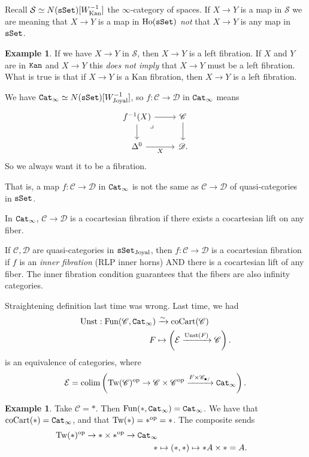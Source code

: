 \documentclass[12pt]{amsart}
\theoremstyle{definition}
\newtheorem{example}[theorem]{Example}
\providecommand{\Unst}{\text{Unst}}
\providecommand{\coCart}{\text{coCart}}
\providecommand{\Tw}{\text{Tw}}
\begin{document}
Recall $\mathcal{S} \simeq N(\texttt{sSet})[W_{\text{Kan}}^{-1}]$ the $\infty$-category of spaces. If $X \to Y$ is a map in $\mathcal{S}$ we are meaning that $X \to Y$ is a map in $\text{Ho}(\texttt{sSet})$ \textit{not} that $X \to Y$ is any map in $\texttt{sSet}$.

\begin{example} If we have $X \to Y$ in $\mathcal{S}$, then $X \to Y$ is a left fibration. If $X$ and $Y$ are in $\texttt{Kan}$ and $X \to Y$ this \textit{does not imply} that $X \to Y$ must be a left fibration. What is true is that if $X \to Y$ is a Kan fibration, then $X \to Y$ is a left fibration.
\end{example}

We have $\texttt{Cat}_\infty\simeq N(\texttt{sSet})[W_{\text{Joyal}}^{-1}]$, so $f: \mathscr{C} \to \mathscr{D}$ in $\texttt{Cat}_\infty$ means
\[ \begin{tikzcd}
    f^{-1}(X)\rar\dar\pb & \mathscr{C}\dar\\
    \Delta^0\rar["X" below] & \mathscr{D}.
\end{tikzcd} \]
So we always want it to be a fibration.

That is, a map $f: \mathscr{C} \to \mathscr{D}$ in $\texttt{Cat}_\infty$ is not the same as $\mathscr{C} \to \mathscr{D}$ of quasi-categories in $\texttt{sSet}$.

In $\texttt{Cat}_\infty$, $\mathscr{C} \to \mathscr{D}$ is a cocartesian fibration if there exists a cocartesian lift on any fiber.

If $\mathscr{C},\mathscr{D}$ are quasi-categories in $\texttt{sSet}_\text{Joyal}$, then $f: \mathscr{C} \to \mathscr{D}$ is a cocartesian fibration if $f$ is an \textit{inner fibration} (RLP inner horns) AND there is a cocartesian lift of any fiber. The inner fibration condition guarantees that the fibers are also infinity categories.

Straightening definition last time was wrong. Last time, we had
\begin{align*}
    \Unst: \Fun(\mathscr{C}, \Cat_\infty) &\xto{\sim} \coCart(\mathscr{C}) \\
    F &\mapsto \left( \mathcal{E} \xto{\Unst(F)} \mathscr{C} \right).
\end{align*}
is an equivalence of categories, where
\begin{align*}
    \mathcal{E} = \colim \left( \Tw(\mathscr{C})^\op \to \mathscr{C} \times \mathscr{C}^\op \xto{F \times \mathscr{C}_{\bullet/}} \Cat_\infty \right).
\end{align*}

\begin{example} Take $\mathscr{C} = \ast$. Then $\text{Fun}(\ast,\texttt{Cat}_\infty)=\texttt{Cat}_\infty$. We have that $\coCart(\ast)=\Cat_\infty$, and that $\Tw(\ast) = \ast^\op = \ast$. The composite sends
\begin{align*}
    \Tw(\ast)^\op \to \ast \times \ast^\op \to \Cat_\infty \\
    \ast &\mapsto (\ast,\ast) \mapsto \ast A \times \ast = A.
\end{align*}
\end{example}
\end{document}

